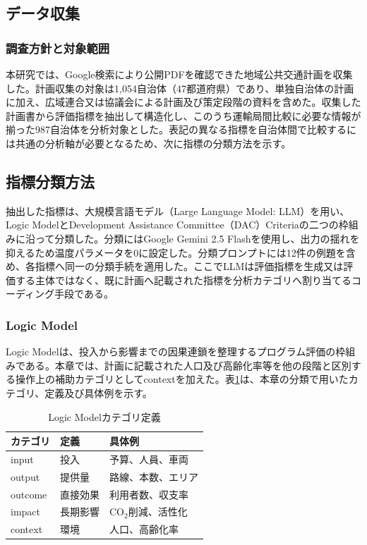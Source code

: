 \subsection{データ収集}

\subsubsection{調査方針と対象範囲}

本研究では、Google検索により公開PDFを確認できた地域公共交通計画を収集した。計画収集の対象は1,054自治体（47都道府県）であり、単独自治体の計画に加え、広域連合又は協議会による計画及び策定段階の資料を含めた。収集した計画書から評価指標を抽出して構造化し、このうち運輸局間比較に必要な情報が揃った987自治体を分析対象とした。表記の異なる指標を自治体間で比較するには共通の分析軸が必要となるため、次に指標の分類方法を示す。

\subsection{指標分類方法}

抽出した指標は、大規模言語モデル（Large Language Model: LLM）を用い、Logic ModelとDevelopment Assistance Committee（DAC）Criteriaの二つの枠組みに沿って分類した。分類にはGoogle Gemini 2.5 Flashを使用し、出力の揺れを抑えるため温度パラメータを0に設定した。分類プロンプトには12件の例題を含め、各指標へ同一の分類手続を適用した。ここでLLMは評価指標を生成又は評価する主体ではなく、既に計画へ記載された指標を分析カテゴリへ割り当てるコーディング手段である。

\subsubsection{Logic Model}

Logic Modelは、投入から影響までの因果連鎖を整理するプログラム評価の枠組みである\cite{minoru2020,rossi2004}。本章では、計画に記載された人口及び高齢化率等を他の段階と区別する操作上の補助カテゴリとしてcontextを加えた。表\ref{tab:logic_model}は、本章の分類で用いたカテゴリ、定義及び具体例を示す。

\begin{table}[htbp]
\caption{Logic Modelカテゴリ定義}
\label{tab:logic_model}
\centering
\begin{tabular}{llp{5cm}}
\toprule
カテゴリ & 定義 & 具体例 \\
\midrule
input & 投入 & 予算、人員、車両 \\
output & 提供量 & 路線、本数、エリア \\
outcome & 直接効果 & 利用者数、収支率 \\
impact & 長期影響 & CO$_2$削減、活性化 \\
context & 環境 & 人口、高齢化率 \\
\bottomrule
\end{tabular}
\end{table}


